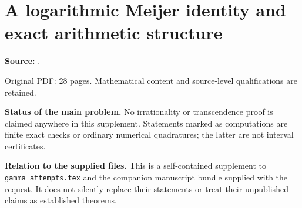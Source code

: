 \documentclass[11pt,a4paper]{article}
\theoremstyle{definition}
\theoremstyle{remark}
\DeclareMathOperator{\Log}{Log}
\numberwithin{equation}{section}
\begin{document}
\part{A logarithmic Meijer identity and exact arithmetic structure}
\label{part7:start}
\noindent\textbf{Source:} {\small{}}.

Original PDF: 28 pages. Mathematical content and source-level qualifications are retained.


\begin{abstract}
We continue the supplied attempts on Euler's constant by replacing several
numerical or structural obstacles with exact statements. A Mellin--Barnes
contour shift gives an arbitrary-parameter residue tower whose first
nonconstant output is $\gamma+\Log z$. For a rank-three trajectory in the
October 2026 Meijer construction, we determine the entire projected integer
lattice: it is the image of
$n!\left(\begin{smallmatrix}1&3H_n\\0&1\end{smallmatrix}\right)$.
The proof combines a characteristic-$p$ differential identity with
logarithmic Frobenius solutions and an adjoint pairing. We also determine
the integer kernel of the elementary Gamma integral, prove sharp
pointwise-positivity and uniform absolute-integral barriers, and obtain an
odd-prime congruence yielding exact common-denominator growth for Dickman
moments and their fixed polynomial transforms.

These are proved identities and arithmetic results, not a proof that
$\gamma$ is irrational or transcendental. In particular, unrestricted
selection of an integer initial vector in the exact lattice encodes
arbitrary rational approximation and does not preserve a fixed
trajectory's error estimate. A separate height-controlled,
nonvanishing small-form construction remains missing. The results were
derived and checked for this continuation; historical priority is not
claimed.
\end{abstract}

\medskip
\noindent\textbf{Status of the main problem.}
No irrationality or transcendence proof is claimed anywhere in this
supplement. Statements marked as computations are finite exact checks or
ordinary numerical quadratures; the latter are not interval certificates.

\medskip
\noindent\textbf{Relation to the supplied files.}
This is a self-contained supplement to \texttt{gamma\_attempts.tex} and the
companion manuscript bundle supplied with the request. It does not silently
replace their statements or treat their unpublished claims as established
theorems.
\end{document}
